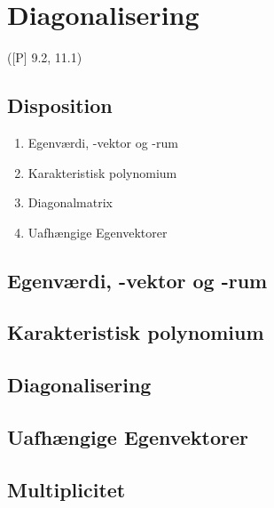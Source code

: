 \newpage
\chapter{Diagonalisering}
([P] 9.2, 11.1)

\section*{Disposition}
\begin{enumerate}
	\item Egenværdi, -vektor og -rum
	\item Karakteristisk polynomium
	\item Diagonalmatrix
	\item Uafhængige Egenvektorer
\end{enumerate}

\section{Egenværdi, -vektor og -rum}


\section{Karakteristisk polynomium}


\section{Diagonalisering}




\section{Uafhængige Egenvektorer}


\section*{Multiplicitet}



